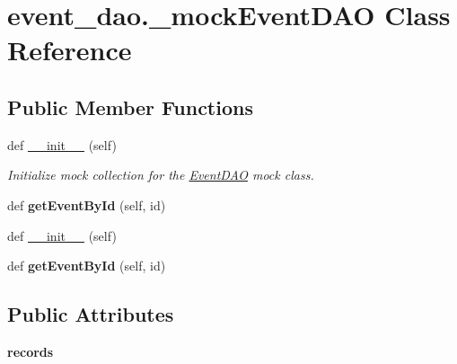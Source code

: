 \hypertarget{classevent__dao_1_1__mock_event_d_a_o}{}\section{event\+\_\+dao.\+\_\+mock\+Event\+D\+AO Class Reference}
\label{classevent__dao_1_1__mock_event_d_a_o}
\subsection*{Public Member Functions}
\begin{DoxyCompactItemize}
\item 
\mbox{\label{classevent__dao_1_1__mock_event_d_a_o_af692581b8c4bb00a4d5808a5ffe8783a}} 
def \hyperlink{classevent__dao_1_1__mock_event_d_a_o_af692581b8c4bb00a4d5808a5ffe8783a}{\+\_\+\+\_\+init\+\_\+\+\_\+} (self)
\begin{DoxyCompactList}\small\item\em Initialize mock collection for the \hyperlink{classevent__dao_1_1_event_d_a_o}{Event\+D\+AO} mock class. \end{DoxyCompactList}\item 
\mbox{\label{classevent__dao_1_1__mock_event_d_a_o_a69cc619582c79a19a10e86c7f15e2e68}} 
def {\bfseries get\+Event\+By\+Id} (self, id)
\item 
def \hyperlink{classevent__dao_1_1__mock_event_d_a_o_af692581b8c4bb00a4d5808a5ffe8783a}{\+\_\+\+\_\+init\+\_\+\+\_\+} (self)
\item 
\mbox{\label{classevent__dao_1_1__mock_event_d_a_o_a69cc619582c79a19a10e86c7f15e2e68}} 
def {\bfseries get\+Event\+By\+Id} (self, id)
\end{DoxyCompactItemize}
\subsection*{Public Attributes}
\begin{DoxyCompactItemize}
\item 
\mbox{\label{classevent__dao_1_1__mock_event_d_a_o_ae5dc149b35df986b3782b08740d0cecd}} 
{\bfseries records}
\end{DoxyCompactItemize}


